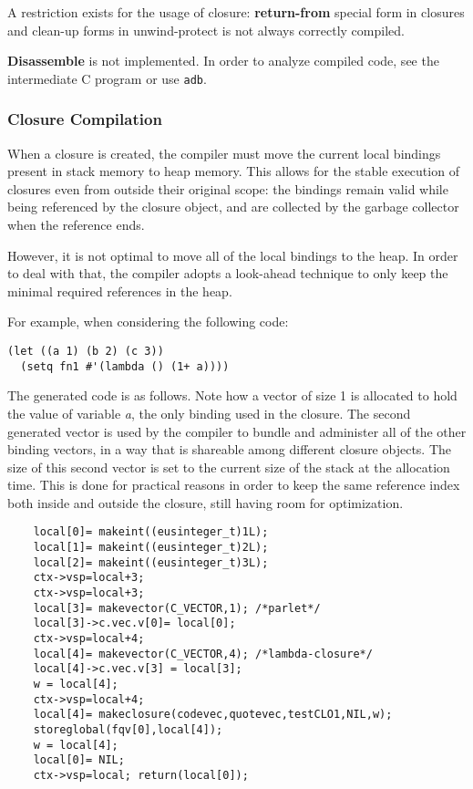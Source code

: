 A restriction exists for the usage of closure:
{\bf return-from} special form in closures and clean-up forms in 
unwind-protect is not always correctly compiled.

{\bf Disassemble} is not implemented.
In order to analyze compiled code, see the intermediate C program
or use {\tt adb}.

\subsubsection{Closure Compilation}

When a closure is created, the compiler must move the current local bindings present in stack memory to heap memory. This allows for the stable execution of closures even from outside their original scope: the bindings remain valid while being referenced by the closure object, and are collected by the garbage collector when the reference ends.

However, it is not optimal to move all of the local bindings to the heap. In order to deal with that, the compiler adopts a look-ahead technique to only keep the minimal required references in the heap.

For example, when considering the following code:
\begin{verbatim}
(let ((a 1) (b 2) (c 3))
  (setq fn1 #'(lambda () (1+ a))))
\end{verbatim}

The generated code is as follows. Note how a vector of size 1 is allocated to hold the value of variable {\em a}, the only binding used in the closure. The second generated vector is used by the compiler to bundle and administer all of the other binding vectors, in a way that is shareable among different closure objects. The size of this second vector is set to the current size of the stack at the allocation time. This is done for practical reasons in order to keep the same reference index both inside and outside the closure, still having room for optimization.

\begin{verbatim}
	local[0]= makeint((eusinteger_t)1L);
	local[1]= makeint((eusinteger_t)2L);
	local[2]= makeint((eusinteger_t)3L);
	ctx->vsp=local+3;
	ctx->vsp=local+3;
	local[3]= makevector(C_VECTOR,1); /*parlet*/
	local[3]->c.vec.v[0]= local[0];
	ctx->vsp=local+4;
	local[4]= makevector(C_VECTOR,4); /*lambda-closure*/
	local[4]->c.vec.v[3] = local[3];
	w = local[4];
	ctx->vsp=local+4;
	local[4]= makeclosure(codevec,quotevec,testCLO1,NIL,w);
	storeglobal(fqv[0],local[4]);
	w = local[4];
	local[0]= NIL;
	ctx->vsp=local; return(local[0]);
\end{verbatim}


